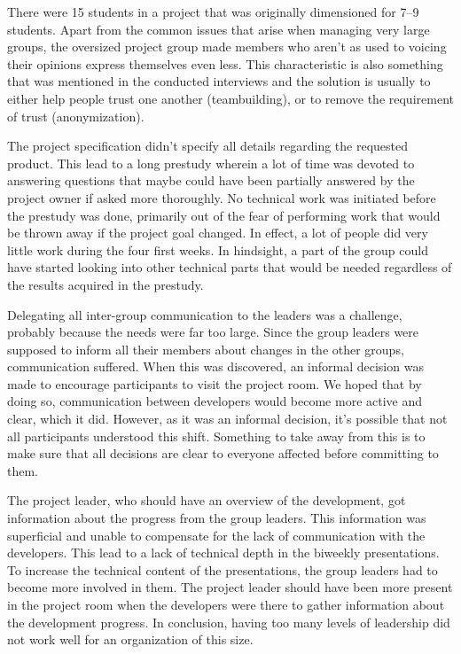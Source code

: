 There were 15 students in a project that was originally dimensioned for 7--9 students. Apart from the common issues that arise when managing very large groups, the oversized project group made members who aren't as used to voicing their opinions express themselves even less. This characteristic is also something that was mentioned in the conducted interviews and the solution is usually to either help people trust one another (teambuilding), or to remove the requirement of trust (anonymization). 

The project specification didn't specify all details regarding the requested product. This lead to a long prestudy wherein a lot of time was devoted to answering questions that maybe could have been partially answered by the project owner if asked more thoroughly. No technical work was initiated before the prestudy was done, primarily out of the fear of performing work that would be thrown away if the project goal changed. In effect, a lot of people did very little work during the four first weeks. In hindsight, a part of the group could have started looking into other technical parts that would be needed regardless of the results acquired in the prestudy.

Delegating all inter-group communication to the leaders was a challenge, probably because the needs were far too large. Since the group leaders were supposed to inform all their members about changes in the other groups, communication suffered. When this was discovered, an informal decision was made to encourage participants to visit the project room. We hoped that by doing so, communication between developers would become more active and clear, which it did. However, as it was an informal decision, it's possible that not all participants understood this shift. Something to take away from this is to make sure that all decisions are clear to everyone affected before committing to them.

The project leader, who should have an overview of the development, got information about the progress from the group leaders. This information was superficial and unable to compensate for the lack of communication with the developers. This lead to a lack of technical depth in the biweekly presentations. To increase the technical content of the presentations, the group leaders had to become more involved in them. The project leader should have been more present in the project room when the developers were there to gather information about the development progress. In conclusion, having too many levels of leadership did not work well for an organization of this size.

